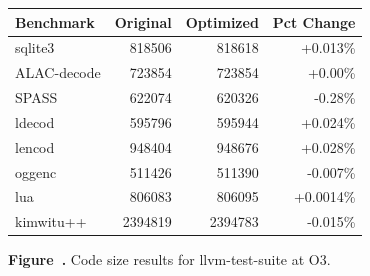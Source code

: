 \par\vspace{1.2em}

\begin{center}
{\normalfont\normalsize
\setlength{\tabcolsep}{5pt}
\renewcommand{\arraystretch}{1.08}
\begin{tabular}{@{}lrrr@{}}
\toprule
Benchmark & Original & Optimized & Pct Change \\
\midrule
sqlite3 & 818506 & 818618 & +0.013\% \\
ALAC-decode & 723854 & 723854 & +0.00\% \\
SPASS & 622074 & 620326 & -0.28\% \\
ldecod & 595796 & 595944 & +0.024\% \\
lencod & 948404 & 948676 & +0.028\% \\
oggenc & 511426 & 511390 & -0.007\% \\
lua & 806083 & 806095 & +0.0014\% \\
kimwitu++ & 2394819 & 2394783 & -0.015\% \\
\bottomrule
\end{tabular}
}
\end{center}

\vspace{0.12em}

\label{fig:figure11}

\begin{center}
\small\textbf{Figure~\thefigure.} Code size results for llvm-test-suite at O3.
\end{center}

\par\vspace{1.2em}
